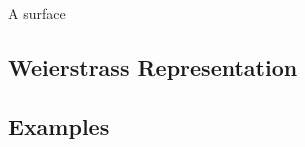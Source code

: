 
  


  \begin{defn}
    A surface 
  \end{defn}

\subsection{Weierstrass Representation}
\subsection{Examples}
